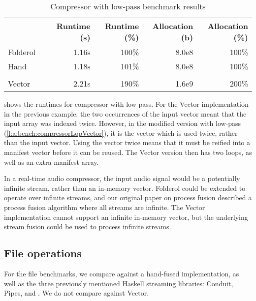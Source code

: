 \begin{table}
\begin{center}
\begin{tabular}{ll|rrrr}
& & Runtime (s)  & Runtime (\%) & Allocation (b) & Allocation (\%) \\
\hline
Folderol &          & 1.16s &   100\% & 8.0e8 & 100\% \\
Hand     &          & 1.18s &   101\% & 8.0e8 & 100\% \\
&&&\\
Vector &            & 2.21s &   190\% & 1.6e9 & 200\%\\
\end{tabular}
\end{center}
\caption[Compressor with low-pass benchmark results]{Compressor with low-pass benchmark results}
\label{table:bench:compressorlop}
\end{table}

 shows the runtimes for compressor with low-pass.
For the Vector implementation in the previous example, the two occurrences of the input vector meant that the input array was indexed twice.
However, in the modified version with low-pass (\cref{l:a:bench:compressorLopVector}), it is the \Hs@lopass@ vector which is used twice, rather than the input vector.
Using the \Hs@lopass@ vector twice means that it must be reified into a manifest vector before it can be reused.
The Vector version then has two loops, as well as an extra manifest array.

In a real-time audio compressor, the input audio signal would be a potentially infinite stream, rather than an in-memory vector.
Folderol could be extended to operate over infinite streams, and our original paper on process fusion \citep{robinson2017machine} described a process fusion algorithm where all streams are infinite.
The Vector implementation cannot support an infinite in-memory vector, but the underlying stream fusion \citep{coutts2007stream} could be used to process infinite streams.


\subsection{File operations}
For the file benchmarks, we compare against a hand-fused implementation, as well as the three previously mentioned Haskell streaming libraries: Conduit, Pipes, and \Streaming.
We do not compare against Vector.

